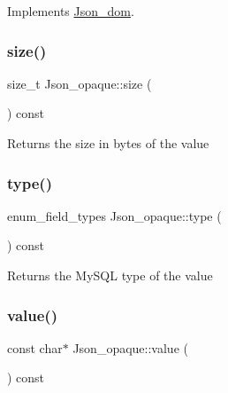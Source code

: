 Implements \mbox{\hyperlink{classJson__dom_aed953eca1e112aade66511ad1bbf82b8}{Json\+\_\+dom}}.

\mbox{\label{classJson__opaque_a2fbbcd3d9081289cc0c591630e219ae1}} 
\subsubsection{\texorpdfstring{size()}{size()}}
{\footnotesize\ttfamily size\+\_\+t Json\+\_\+opaque\+::size (\begin{DoxyParamCaption}{ }\end{DoxyParamCaption}) const\hspace{0.3cm}{\ttfamily [inline]}}

\begin{DoxyReturn}{Returns}
the size in bytes of the value 
\end{DoxyReturn}
\mbox{\label{classJson__opaque_a26750dc18ad9eb5333e82a0b25815f29}} 
\subsubsection{\texorpdfstring{type()}{type()}}
{\footnotesize\ttfamily enum\+\_\+field\+\_\+types Json\+\_\+opaque\+::type (\begin{DoxyParamCaption}{ }\end{DoxyParamCaption}) const\hspace{0.3cm}{\ttfamily [inline]}}

\begin{DoxyReturn}{Returns}
the My\+S\+QL type of the value 
\end{DoxyReturn}
\mbox{\label{classJson__opaque_a88b1367f0b9ae23450f478c08dd2bc36}} 
\subsubsection{\texorpdfstring{value()}{value()}}
{\footnotesize\ttfamily const char$\ast$ Json\+\_\+opaque\+::value (\begin{DoxyParamCaption}{ }\end{DoxyParamCaption}) const\hspace{0.3cm}{\ttfamily [inline]}}

